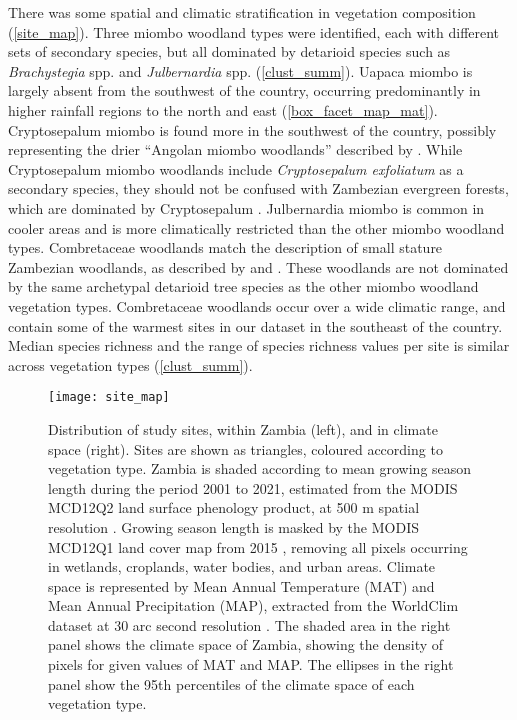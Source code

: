 \documentclass[11pt,a4paper]{article}
\begin{document}
There was some spatial and climatic stratification in vegetation composition
(\autoref{site_map}). Three miombo woodland types were identified, each with
different sets of secondary species, but all dominated by detarioid species
such as \textit{Brachystegia} spp. and \textit{Julbernardia} spp.
(\autoref{clust_summ}). Uapaca miombo is largely absent from the southwest of
the country, occurring predominantly in higher rainfall regions to the north
and east (\autoref{box_facet_map_mat}). Cryptosepalum miombo is found more in
the southwest of the country, possibly representing the drier ``Angolan miombo
woodlands'' described by \citet{White1983}. While Cryptosepalum miombo
woodlands include \textit{Cryptosepalum exfoliatum} as a secondary species,
they should not be confused with Zambezian evergreen forests, which are
dominated by Cryptosepalum \citep{White1983}. Julbernardia miombo is common in
cooler areas and is more climatically restricted than the other miombo woodland
types. Combretaceae woodlands match the description of small stature Zambezian
woodlands, as described by \citet{Dinerstein2017} and \citet{Chidumayo2001}.
These woodlands are not dominated by the same archetypal detarioid tree species
as the other miombo woodland vegetation types. Combretaceae woodlands occur
over a wide climatic range, and contain some of the warmest sites in our
dataset in the southeast of the country. Median species richness and the range
of species richness values per site is similar across vegetation types
(\autoref{clust_summ}). 

\begin{figure}[H]
\centering
	\texttt{[image: site\_map]}
	\caption{Distribution of study sites, within Zambia (left), and in climate
		space (right). Sites are shown as triangles, coloured according to
		vegetation type. Zambia is shaded according to mean growing season
		length during the period 2001 to 2021, estimated from the MODIS MCD12Q2
		land surface phenology product, at 500 m spatial resolution
		\citep{MCD12Q2}. Growing season length is masked by the MODIS MCD12Q1
		land cover map from 2015 \citep{MCD12Q1}, removing all pixels occurring
		in wetlands, croplands, water bodies, and urban areas. Climate space is
		represented by Mean Annual Temperature (MAT) and Mean Annual
		Precipitation (MAP), extracted from the WorldClim dataset at 30 arc
		second resolution \citep{Fick2017}. The shaded area in the right panel
		shows the climate space of Zambia, showing the density of pixels for given
		values of MAT and MAP. The ellipses in the right panel show the 95th
		percentiles of the climate space of each vegetation type.} 
	\label{site_map}
\end{figure}
\end{document}
